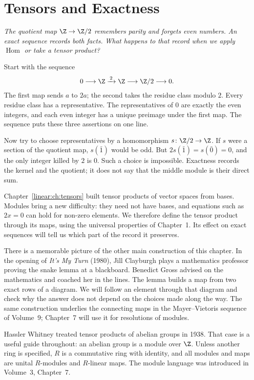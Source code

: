 \chapter{Tensors and Exactness}

\begin{center}\itshape
The quotient map $\Z\to\Z/2$ remembers parity and forgets even numbers. An exact sequence records both facts. What happens to that record when we apply $\operatorname{Hom}$ or take a tensor product?
\end{center}

Start with the sequence
\[
0\longrightarrow\Z\xrightarrow{\,2\,}\Z
\longrightarrow\Z/2\longrightarrow0.
\]
The first map sends $a$ to $2a$; the second takes the residue class modulo $2$. Every residue class has a representative. The representatives of $0$ are exactly the even integers, and each even integer has a unique preimage under the first map. The sequence puts these three assertions on one line.

Now try to choose representatives by a homomorphism $s\colon\Z/2\to\Z$. If $s$ were a section of the quotient map, $s(\bar1)$ would be odd. But $2s(\bar1)=s(\bar0)=0$, and the only integer killed by $2$ is $0$. Such a choice is impossible. Exactness records the kernel and the quotient; it does not say that the middle module is their direct sum.

Chapter~\ref{linear:ch:tensors} built tensor products of vector spaces from bases. Modules bring a new difficulty: they need not have bases, and equations such as $2x=0$ can hold for non-zero elements. We therefore define the tensor product through its maps, using the universal properties of Chapter~1. Its effect on exact sequences will tell us which part of the record it preserves.

There is a memorable picture of the other main construction of this chapter. In the opening of \emph{It's My Turn} (1980), Jill Clayburgh plays a mathematics professor proving the snake lemma at a blackboard. Benedict Gross advised on the mathematics and coached her in the lines. The lemma builds a map from two exact rows of a diagram. We will follow an element through that diagram and check why the answer does not depend on the choices made along the way. The same construction underlies the connecting maps in the Mayer--Vietoris sequence of Volume~9; Chapter~7 will use it for resolutions of modules.

Hassler Whitney treated tensor products of abelian groups in 1938. That case is a useful guide throughout: an abelian group is a module over $\Z$. Unless another ring is specified, $R$ is a commutative ring with identity, and all modules and maps are unital $R$-modules and $R$-linear maps. The module language was introduced in Volume~3, Chapter~7.

